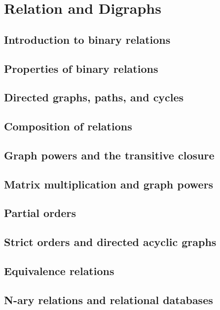 \section{Relation and Digraphs}
\subsection{Introduction to binary relations}
\subsection{Properties of binary relations}
\subsection{Directed graphs, paths, and cycles}
\subsection{Composition of relations}
\subsection{Graph powers and the transitive closure}
\subsection{Matrix multiplication and graph powers}
\subsection{Partial orders}
\subsection{Strict orders and directed acyclic graphs}
\subsection{Equivalence relations}
\subsection{N-ary relations and relational databases}